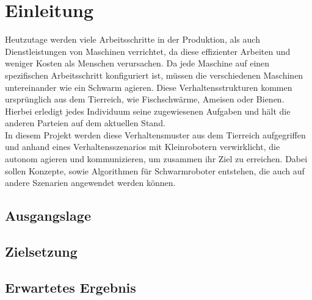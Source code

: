 \setcounter{page}{1}
\ofoot{\pagemark}

\section{Einleitung}
Heutzutage werden viele Arbeitsschritte in der Produktion, als auch Dienstleistungen von Maschinen verrichtet, da diese effizienter Arbeiten und weniger Kosten als Menschen verursachen. Da jede Maschine auf einen spezifischen Arbeitsschritt konfiguriert ist, müssen die verschiedenen Maschinen untereinander wie ein Schwarm agieren. Diese Verhaltensstrukturen kommen ursprünglich aus dem Tierreich, wie Fischschwärme, Ameisen oder Bienen. Hierbei erledigt jedes Individuum seine zugewiesenen Aufgaben und hält die anderen Parteien auf dem aktuellen Stand.\\
In diesem Projekt werden diese Verhaltensmuster aus dem Tierreich aufgegriffen und anhand eines Verhaltensszenarios mit Kleinrobotern verwirklicht, die autonom agieren und kommunizieren, um zusammen ihr Ziel zu erreichen. Dabei sollen Konzepte, sowie Algorithmen für Schwarmroboter entstehen, die auch auf andere Szenarien angewendet werden können.\\

\subsection{Ausgangslage}
\subsection{Zielsetzung}
\subsection{Erwartetes Ergebnis}
